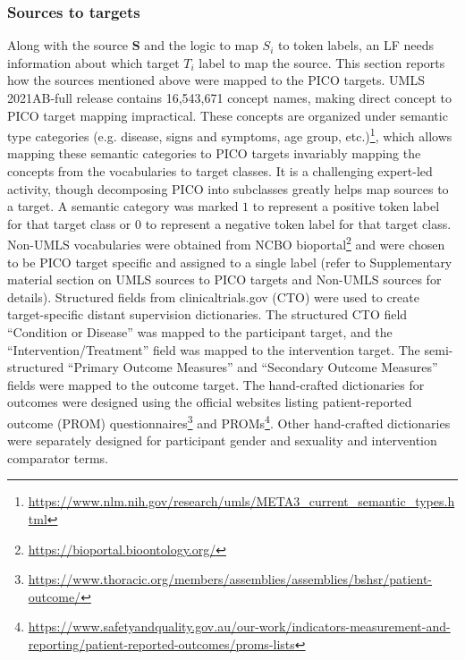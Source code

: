 \documentclass[10.7pt,]{article}
\begin{document}
\subsubsection{Sources to targets}\label{s2t}
%
Along with the source $\bm{S}$ and the logic to map $S_{i}$ to token labels, an LF needs information about which target $T_{i}$ label to map the source.
This section reports how the sources mentioned above were mapped to the PICO targets.
UMLS 2021AB-full release contains 16,543,671 concept names, making direct concept to PICO target mapping impractical.
These concepts are organized under semantic type categories (e.g. disease, signs and symptoms, age group, etc.)\footnote{\url{https://www.nlm.nih.gov/research/umls/META3_current_semantic_types.html}}, which allows mapping these semantic categories to PICO targets invariably mapping the concepts from the vocabularies to target classes.\cite{mccray2001aggregating}
It is a challenging expert-led activity, though decomposing PICO into subclasses greatly helps map sources to a target.
A semantic category was marked $1$ to represent a positive token label for that target class or $0$ to represent a negative token label for that target class.
Non-UMLS vocabularies were obtained from NCBO bioportal\footnote{\url{https://bioportal.bioontology.org/}} and were chosen to be PICO target specific and assigned to a single label (refer to Supplementary material section on UMLS sources to PICO targets and Non-UMLS sources  for details).
Structured fields from clinicaltrials.gov (CTO) were used to create target-specific distant supervision dictionaries.
The structured CTO field ``Condition or Disease'' was mapped to the participant target, and the ``Intervention/Treatment'' field was mapped to the intervention target.
The semi-structured ``Primary Outcome Measures'' and ``Secondary Outcome Measures'' fields were mapped to the outcome target.
The hand-crafted dictionaries for outcomes were designed using the official websites listing patient-reported outcome (PROM) questionnaires\footnote{\url{https://www.thoracic.org/members/assemblies/assemblies/bshsr/patient-outcome/}} and PROMs\footnote{\url{https://www.safetyandquality.gov.au/our-work/indicators-measurement-and-reporting/patient-reported-outcomes/proms-lists}}.
Other hand-crafted dictionaries were separately designed for participant gender and sexuality and intervention comparator terms.
%
%
%
\end{document}
